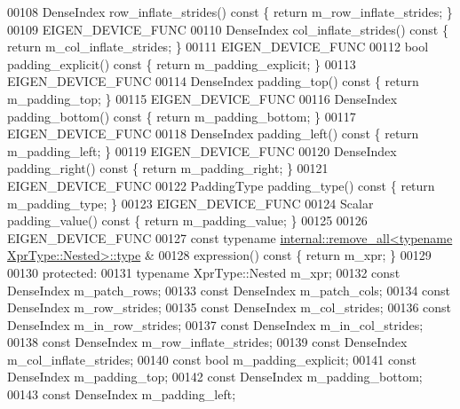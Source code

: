 \begin{DoxyCode}
00108     DenseIndex row\_inflate\_strides()\textcolor{keyword}{ const }\{ \textcolor{keywordflow}{return} m\_row\_inflate\_strides; \}
00109     EIGEN\_DEVICE\_FUNC
00110     DenseIndex col\_inflate\_strides()\textcolor{keyword}{ const }\{ \textcolor{keywordflow}{return} m\_col\_inflate\_strides; \}
00111     EIGEN\_DEVICE\_FUNC
00112     \textcolor{keywordtype}{bool} padding\_explicit()\textcolor{keyword}{ const }\{ \textcolor{keywordflow}{return} m\_padding\_explicit; \}
00113     EIGEN\_DEVICE\_FUNC
00114     DenseIndex padding\_top()\textcolor{keyword}{ const }\{ \textcolor{keywordflow}{return} m\_padding\_top; \}
00115     EIGEN\_DEVICE\_FUNC
00116     DenseIndex padding\_bottom()\textcolor{keyword}{ const }\{ \textcolor{keywordflow}{return} m\_padding\_bottom; \}
00117     EIGEN\_DEVICE\_FUNC
00118     DenseIndex padding\_left()\textcolor{keyword}{ const }\{ \textcolor{keywordflow}{return} m\_padding\_left; \}
00119     EIGEN\_DEVICE\_FUNC
00120     DenseIndex padding\_right()\textcolor{keyword}{ const }\{ \textcolor{keywordflow}{return} m\_padding\_right; \}
00121     EIGEN\_DEVICE\_FUNC
00122     PaddingType padding\_type()\textcolor{keyword}{ const }\{ \textcolor{keywordflow}{return} m\_padding\_type; \}
00123     EIGEN\_DEVICE\_FUNC
00124     Scalar padding\_value()\textcolor{keyword}{ const }\{ \textcolor{keywordflow}{return} m\_padding\_value; \}
00125 
00126     EIGEN\_DEVICE\_FUNC
00127     \textcolor{keyword}{const} \textcolor{keyword}{typename} \hyperlink{group___sparse_core___module}{internal::remove\_all<typename XprType::Nested>::type}
      &
00128     expression()\textcolor{keyword}{ const }\{ \textcolor{keywordflow}{return} m\_xpr; \}
00129 
00130   \textcolor{keyword}{protected}:
00131     \textcolor{keyword}{typename} XprType::Nested m\_xpr;
00132     \textcolor{keyword}{const} DenseIndex m\_patch\_rows;
00133     \textcolor{keyword}{const} DenseIndex m\_patch\_cols;
00134     \textcolor{keyword}{const} DenseIndex m\_row\_strides;
00135     \textcolor{keyword}{const} DenseIndex m\_col\_strides;
00136     \textcolor{keyword}{const} DenseIndex m\_in\_row\_strides;
00137     \textcolor{keyword}{const} DenseIndex m\_in\_col\_strides;
00138     \textcolor{keyword}{const} DenseIndex m\_row\_inflate\_strides;
00139     \textcolor{keyword}{const} DenseIndex m\_col\_inflate\_strides;
00140     \textcolor{keyword}{const} \textcolor{keywordtype}{bool} m\_padding\_explicit;
00141     \textcolor{keyword}{const} DenseIndex m\_padding\_top;
00142     \textcolor{keyword}{const} DenseIndex m\_padding\_bottom;
00143     \textcolor{keyword}{const} DenseIndex m\_padding\_left;

\end{DoxyCode}
